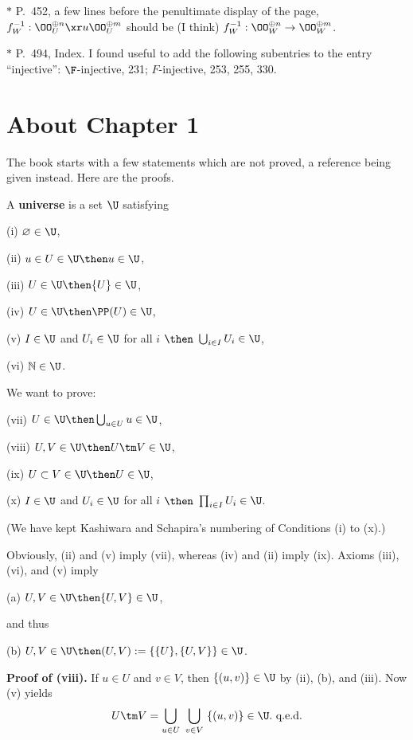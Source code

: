 \documentclass[12pt]{article}
\theoremstyle{remark}
\theoremstyle{definition}
\begin{document}
\nn$*$ P.~452, a few lines before the penultimate display of the page, $f_W^{-1}:\OO_U^{\oplus n}\xr u\OO_U^{\oplus m}$ should be (I think) $f_W^{-1}:\OO_W^{\oplus n}\to\OO_W^{\oplus m}$.

\nn$*$ P.~494, Index. I found useful to add the following subentries to the entry ``injective'': $\F$-injective, 231; $F$-injective, 253, 255, 330.


\section{About Chapter 1}


The book starts with a few statements which are not proved, a reference being given instead. Here are the proofs.

A \textbf{universe} is a set $\U$ satisfying 

(i) $\varnothing\in\U$,

(ii) $u\in U\in\U\then u\in\U$,

(iii) $U\in\U\then\{U\}\in\U$,

(iv) $U\in\U\then\PP(U)\in\U$,

(v) $I\in\U$ and $U_i\in\U$ for all $i$ $\then$ $\bigcup_{i\in I}U_i\in\U$,

(vi) $\mathbb N\in\U$.

\nn We want to prove:

(vii) $U\in\U\then\bigcup_{u\in U}u\in\U$,

(viii) $U,V\in\U\then U\tm V\in\U$,

(ix) $U\subset V\in\U\then U\in\U$,

(x) $I\in\U$ and $U_i\in\U$ for all $i$ $\then$ $\prod_{i\in I}U_i\in\U$.

\nn(We have kept Kashiwara and Schapira's numbering of Conditions (i) to (x).) 

\nn Obviously, (ii) and (v) imply (vii), whereas (iv) and (ii) imply (ix). Axioms (iii), (vi), and (v) imply

(a) $U,V\in\U\then\{U,V\}\in\U$,

\nn and thus

(b) $U,V\in\U\then(U,V):=\{\{U\},\{U,V\}\}\in\U$.

\nn\textbf{Proof of (viii).} If $u\in U$ and $v\in V$, then $\{(u,v)\}\in\U$ by (ii), (b), and (iii). Now (v) yields 
$$
U\tm V=\bigcup_{u\in U}\ \bigcup_{v\in V}\ \{(u,v)\}\in\U.\text{ q.e.d.} 
$$ 
\end{document}
